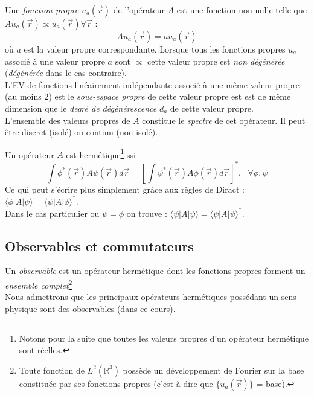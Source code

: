 \documentclass[british,french,11pt, a4paper, openany]{book}
\begin{document}
	Une \textit{fonction propre} $u_a(\vec{r})$ de l'opérateur $A$ est une fonction non nulle telle que $Au_a(\vec{r}) \propto u_a(\vec{r}) \forall \vec{r}$ :
	\begin{equation}
		Au_a(\vec{r}) = au_a(\vec{r})
	\end{equation}
	où $a$ est la valeur propre correspondante. Lorsque tous les fonctions propres $u_a$ associé à une valeur propre $a$ sont $\propto$ cette valeur propre est \textit{non dégénérée} (\textit{dégénérée} dans le cas contraire).\\
	L'EV de fonctions linéairement indépendante associé à une même valeur propre (au moins 2) est le \textit{sous-espace propre} de cette valeur propre est est de même dimension que le \textit{degré de dégénérescence} $d_a$ de cette valeur propre.\\
	
	L'ensemble des valeurs propres de $A$ constitue le \textit{spectre} de cet opérateur. Il peut être discret (isolé) ou continu (non isolé).
	
	Un opérateur $A$ est  hermétique\footnote{Notons pour la suite que toutes les valeurs propres d'un opérateur hermétique sont réelles.} ssi
	\begin{equation}
		\int \phi^*(\vec{r})A\psi(\vec{r})d\vec{r} = \left[ \int\psi^*(\vec{r})A\phi(\vec{r})d\vec{r} \right]^*, \ \ \ \forall \phi, \psi
	\end{equation}
	Ce qui peut s'écrire plus simplement grâce aux règles de Diract : $\langle \phi|A|\psi \rangle = \langle\psi|A|\phi\rangle^*$.\\
	Dans le cas particulier ou $\psi =  \phi$ on trouve : $\langle\psi|A|\psi\rangle = \langle\psi|A|\psi\rangle^*$.
	
	\subsection*{Observables et commutateurs}
	Un \textit{observable} est un opérateur hermétique dont les fonctions propres forment un \textit{ensemble complet}\footnote{Toute fonction de $L^2(\mathbb{R}^3)$ possède un développement de Fourier sur la base constituée par ses fonctions propres (c'est à dire que $\{u_a(\vec{r})\}$ = base).}\\
	Nous admettrons que les principaux opérateurs hermétiques possédant un sens physique sont des observables (dans ce cours).\\
	
\end{document}

